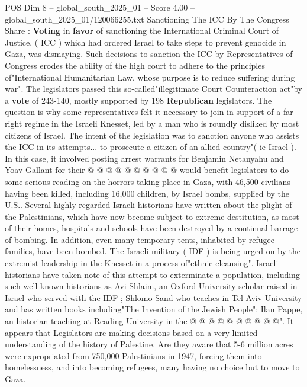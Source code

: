 \begin{textsample}{POS Dim 8 – global\_south\_2025\_01 – Score 4.00 – global\_south\_2025\_01/120066255.txt}  \label{ex:f8_pos_327}
Sanctioning The ICC By The Congress Share : \textbf{Voting} in \textbf{favor} of sanctioning the International Criminal Court of Justice, ( ICC ) which had ordered Israel to take steps to prevent genocide in Gaza, was dismaying.
Such decisions to sanction the ICC by Representatives of Congress erodes the ability of the high court to adhere to the principles of"International Humanitarian Law, whose purpose is to reduce suffering during war".
The legislators passed this so-called"illegitimate Court Counteraction act"by a \textbf{vote} of 243-140, mostly supported by 198 \textbf{Republican} legislators.
The question is why some representatives felt it necessary to join in support of a far-right regime in the Israeli Knesset, led by a man who is roundly disliked by most citizens of Israel.
The intent of the legislation was to sanction anyone who assists the ICC in its attempts... to prosecute a citizen of an allied country"( ie Israel ).
In this case, it involved posting arrest warrants for Benjamin Netanyahu and Yoav Gallant for their @ @ @ @ @ @ @ @ @ @ would benefit legislators to do some serious reading on the horrors taking place in Gaza, with 46,500 civilians having been killed, including 16,000 children, by Israel bombs, supplied by the U.S..
Several highly regarded Israeli historians have written about the plight of the Palestinians, which have now become subject to extreme destitution, as most of their homes, hospitals and schools have been destroyed by a continual barrage of bombing.
In addition, even many temporary tents, inhabited by refugee families, have been bombed.
The Israeli military ( IDF ) is being urged on by the extremist leadership in the Knesset in a process of"ethnic cleansing".
Israeli historians have taken note of this attempt to exterminate a population, including such well-known historians as Avi Shlaim, an Oxford University scholar raised in Israel who served with the IDF ; Shlomo Sand who teaches in Tel Aviv University and has written books including"The Invention of the Jewish People"; Ilan Pappe, an historian teaching at Reading University in the @ @ @ @ @ @ @ @ @ @".
It appears that Legislators are making decisions based on a very limited understanding of the history of Palestine.
Are they aware that 5-6 million acres were expropriated from 750,000 Palestinians in 1947, forcing them into homelessness, and into becoming refugees, many having no choice but to move to Gaza.

\end{textsample}
